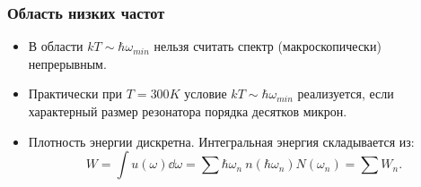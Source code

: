 \documentclass[compress]{beamer}
\begin{document}
    \begin{frame}\frametitle{Область низких частот}

        \begin{itemize}\justifying
            \item В области $kT \sim \hbar\omega_{min}$ нельзя считать спектр (макроскопически) непрерывным.

            \item Практически при $T = 300K$ условие $kT \sim \hbar\omega_{min}$ реализуется, если характерный размер резонатора порядка десятков микрон.

            \item Плотность энергии дискретна. Интегральная энергия складывается из:
            \begin{equation*}
                W = \int u(\omega) \dd{\omega} = \sum \hbar\omega_n\ n(\hbar\omega_n) N(\omega_n) = \sum W_n .
            \end{equation*}

        \end{itemize}

    \end{frame}

\end{document}
